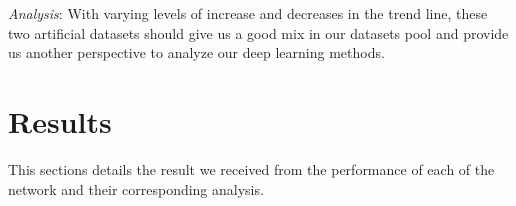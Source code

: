 \documentclass[letterpaper, 10 pt, conference]{ieeeconf}  %
\begin{document}
        \textit{Analysis}: With varying levels of increase and decreases in the trend line, these two artificial datasets should give us a good mix in our datasets pool and provide us another perspective to analyze our deep learning methods.
    
\section{Results}
    This sections details the result we received from the performance of each of the network and their corresponding analysis.
    \begin{table*}[t]
        \centering
        \captionsetup{justification=centering,margin=2cm}
        \caption{Table containing the final loss (MSE and L1) of testing and training after 50 epochs for RNN.}

    \end{table*}
\end{document}
